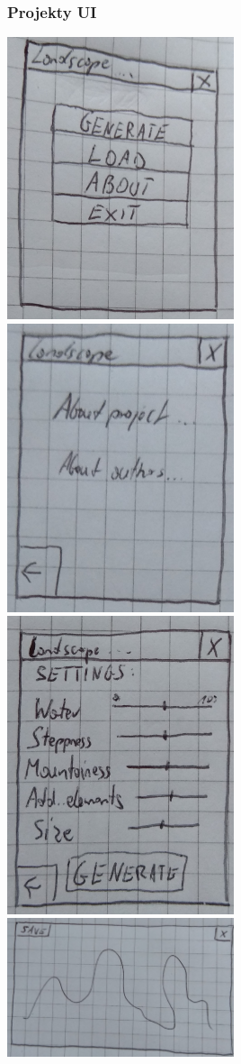 \documentclass[12pt,a4paper]{article}
\begin{document}
\subsubsection{Projekty UI}
\includegraphics[width=0.5\textwidth]{Images/ui-mainForm.jpg}
\includegraphics[width=0.5\textwidth]{Images/ui-about.jpg}
\includegraphics[width=0.5\textwidth]{Images/ui-settings.jpg}
\includegraphics[width=0.5\textwidth]{Images/ui-landscape.jpg}
\end{document}
